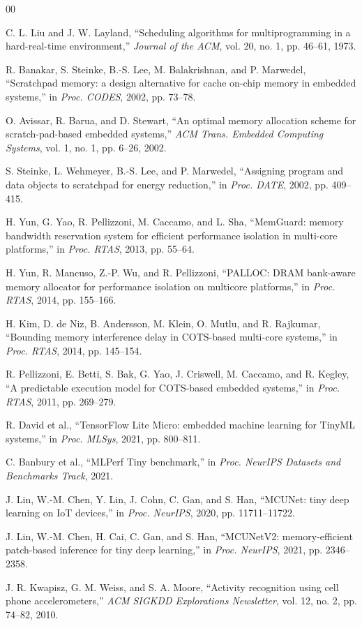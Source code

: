 \documentclass[conference]{IEEEtran}
\begin{document}
\begin{thebibliography}{00}

 C. L. Liu and J. W. Layland, ``Scheduling algorithms
for multiprogramming in a hard-real-time environment,'' \emph{Journal of
the ACM}, vol. 20, no. 1, pp. 46--61, 1973.

 R. Banakar, S. Steinke, B.-S. Lee, M. Balakrishnan,
and P. Marwedel, ``Scratchpad memory: a design alternative for cache
on-chip memory in embedded systems,'' in \emph{Proc. CODES}, 2002, pp.
73--78.

 O. Avissar, R. Barua, and D. Stewart, ``An optimal
memory allocation scheme for scratch-pad-based embedded systems,''
\emph{ACM Trans. Embedded Computing Systems}, vol. 1, no. 1, pp. 6--26,
2002.

 S. Steinke, L. Wehmeyer, B.-S. Lee, and P.
Marwedel, ``Assigning program and data objects to scratchpad for energy
reduction,'' in \emph{Proc. DATE}, 2002, pp. 409--415.

 H. Yun, G. Yao, R. Pellizzoni, M. Caccamo, and L. Sha,
``MemGuard: memory bandwidth reservation system for efficient performance
isolation in multi-core platforms,'' in \emph{Proc. RTAS}, 2013, pp.
55--64.

 H. Yun, R. Mancuso, Z.-P. Wu, and R. Pellizzoni,
``PALLOC: DRAM bank-aware memory allocator for performance isolation on
multicore platforms,'' in \emph{Proc. RTAS}, 2014, pp. 155--166.

 H. Kim, D. de Niz, B. Andersson, M. Klein, O.
Mutlu, and R. Rajkumar, ``Bounding memory interference delay in
COTS-based multi-core systems,'' in \emph{Proc. RTAS}, 2014, pp.
145--154.

 R. Pellizzoni, E. Betti, S. Bak, G. Yao, J.
Criswell, M. Caccamo, and R. Kegley, ``A predictable execution model for
COTS-based embedded systems,'' in \emph{Proc. RTAS}, 2011, pp. 269--279.

 R. David et al., ``TensorFlow Lite Micro: embedded
machine learning for TinyML systems,'' in \emph{Proc. MLSys}, 2021, pp.
800--811.

 C. Banbury et al., ``MLPerf Tiny benchmark,'' in
\emph{Proc. NeurIPS Datasets and Benchmarks Track}, 2021.

 J. Lin, W.-M. Chen, Y. Lin, J. Cohn, C. Gan, and S.
Han, ``MCUNet: tiny deep learning on IoT devices,'' in \emph{Proc.
NeurIPS}, 2020, pp. 11711--11722.

 J. Lin, W.-M. Chen, H. Cai, C. Gan, and S. Han,
``MCUNetV2: memory-efficient patch-based inference for tiny deep
learning,'' in \emph{Proc. NeurIPS}, 2021, pp. 2346--2358.

 J. R. Kwapisz, G. M. Weiss, and S. A. Moore,
``Activity recognition using cell phone accelerometers,'' \emph{ACM
SIGKDD Explorations Newsletter}, vol. 12, no. 2, pp. 74--82, 2010.

\end{thebibliography}
\end{document}
